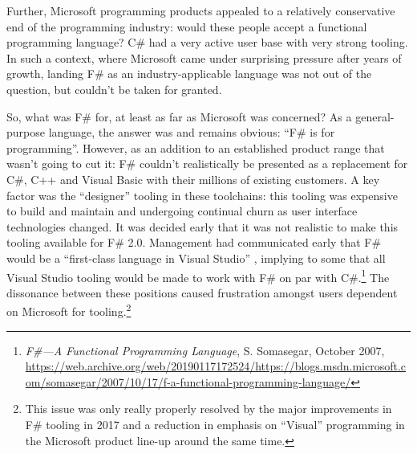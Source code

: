 \documentclass[acmsmall]{acmart}\settopmatter{}
\begin{document}
Further, Microsoft programming products appealed to a relatively conservative end of the programming industry: would
these people accept a functional programming language? C\# had a very active user base with very strong tooling. In
such a context, where Microsoft came under surprising pressure after years of growth, landing F\# as an industry-applicable
language was not out of the question, but couldn’t be taken for granted.


So, what was F\# for, at least as far as Microsoft was concerned?  As a general-purpose language, the answer was and remains
obvious: “F\# is for programming”.  However, as an addition to an established product range that wasn’t going
to cut it: F\# couldn’t realistically be presented as a replacement for C\#, C++ and Visual Basic with their millions of existing customers.
A key factor was the “designer” tooling in these toolchains: this tooling was expensive to build and maintain and undergoing continual
churn as user interface technologies changed. It was decided early that it was not realistic to make this tooling available for F\# 2.0.
Management had communicated early that F\# would be a “first-class language in Visual Studio” , implying to some that all Visual Studio
tooling would be made to work with F\# on par with C\#.\footnote{\textit{F\#---A Functional Programming Language}, S. Somasegar, October 2007, \url{https://web.archive.org/web/20190117172524/https://blogs.msdn.microsoft.com/somasegar/2007/10/17/f-a-functional-programming-language/}}
The dissonance between these positions caused frustration amongst users dependent on Microsoft for
tooling.\footnote{This issue was only really properly resolved by the major improvements in F\# tooling in 2017 and a reduction in emphasis on “Visual” programming in the Microsoft product line-up around the same time.}
\end{document}
